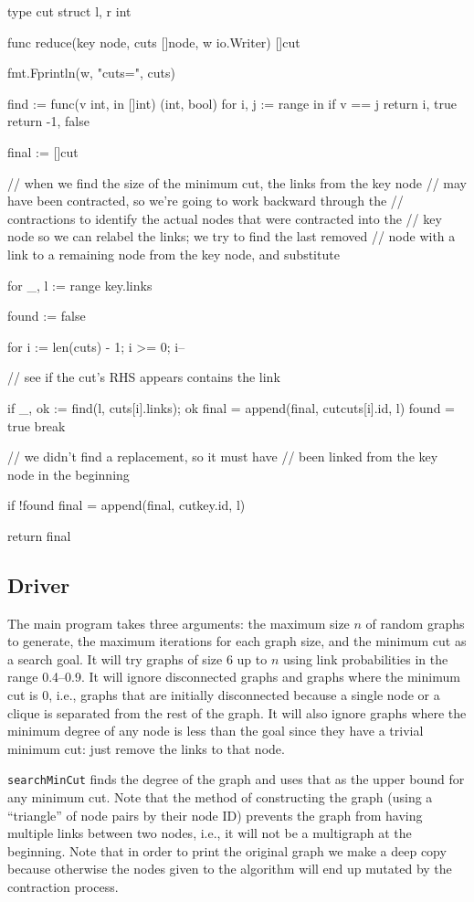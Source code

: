 \documentclass[12pt,notitlepage]{article}
\begin{document}
\begin{golang}
type cut struct {
	l, r int
}

func reduce(key node, cuts []node, w io.Writer) []cut {
	fmt.Fprintln(w, "cuts=", cuts)

	find := func(v int, in []int) (int, bool) {
		for i, j := range in {
			if v == j {
				return i, true
			}
		}
		return -1, false
	}

	final := []cut{}

	// when we find the size of the minimum cut, the links from the key node
	// may have been contracted, so we're going to work backward through the
	// contractions to identify the actual nodes that were contracted into the
	// key node so we can relabel the links; we try to find the last removed
	// node with a link to a remaining node from the key node, and substitute

	for _, l := range key.links {
		found := false

		for i := len(cuts) - 1; i >= 0; i-- {
			// see if the cut's RHS appears contains the link

			if _, ok := find(l, cuts[i].links); ok {
				final = append(final, cut{cuts[i].id, l})
				found = true
				break
			}
		}

		// we didn't find a replacement, so it must have
		// been linked from the key node in the beginning

		if !found {
			final = append(final, cut{key.id, l})
		}
	}

	return final
}
\end{golang}

\subsection{Driver}
The main program takes three arguments: the maximum size $n$ of random graphs to generate, the 
maximum iterations for each graph size, and the minimum cut as a search goal. It will try 
graphs of size 6 up to $n$ using link probabilities in the range 0.4--0.9. It 
will ignore disconnected graphs and graphs where the minimum cut is 0, i.e., graphs that are 
initially disconnected because a single node or a clique is separated from the rest of the 
graph. It will also ignore graphs where the minimum degree of any node is less than the goal
since they have a trivial minimum cut: just remove the links to that node. 

\verb|searchMinCut| 
finds the degree of the graph and uses that as the upper bound for any minimum cut. Note that 
the method of constructing the graph (using a ``triangle'' of node pairs by their node ID) 
prevents the graph from having multiple links between two nodes, i.e., it will not be a multigraph 
at the beginning. Note that in order to print the original graph we make a deep copy because
otherwise the nodes given to the algorithm will end up mutated by the contraction process.
\end{document}
